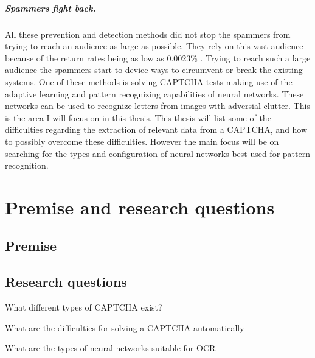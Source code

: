 \documentclass[pdftex,a4paper,12pt,twoside]{report}
\begin{document}
\paragraph{Spammers fight back.}
All these prevention and detection methods did not stop the spammers from trying to reach an audience as large  as possible. They rely on this vast audience because of the return rates being as low as 0.0023\% \citep{Cobb2003}. Trying to reach such a large audience the spammers start to device ways to circumvent or break the existing systems. One of these methods is solving CAPTCHA tests making use of the adaptive learning and pattern recognizing capabilities of neural networks. These networks can be used to recognize letters from images with adversial clutter.
This is the area I will focus on in this thesis. This thesis will list some of the difficulties regarding the extraction of relevant data from a CAPTCHA, and how to possibly overcome these difficulties. However the main focus will be on searching for the types and configuration of neural networks best used for pattern recognition.






\chapter{Premise and research questions}
\label{ch:Premise}

\section{Premise}
\label{sec:Premise}


\section{Research questions}
\label{sec:researquestions}

What different types of CAPTCHA exist?

What are the difficulties for solving a CAPTCHA automatically

What are the types of neural networks suitable for OCR
\end{document}
